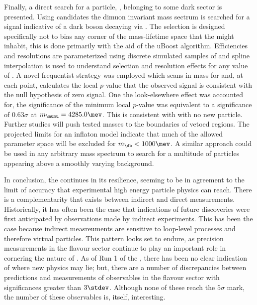 Finally, a direct search for a \np particle, \db, belonging to some dark sector is presented.
Using
\btokstrmumu candidates the dimuon invariant mass sectrum is searched for a signal indicative of a
dark boson decaying via \dbtomumu.
The selection is designed specifically not to bias any corner of the mass-lifetime space that the
\db might inhabit, this is done primarily with the aid of the uBoost algorithm.
Efficiencies and resolutions are parameterized using discrete simulated samples of \btokstrdb
and spline interpolation is used to understand selection and resolution effects for any value of
\mass{\db}.
A novel frequentist strategy was employed which scans in mass for and, at each point, calculates
the local $p$-value that the observed signal is consistent with the null hypothesis of zero signal.
One the look-elsewhere effect was accounted for, the significance of the minimum local $p$-value
was equivalent to a significance of
$0.63\sigma$ at $m_{\mumu}=4285.0\mev$.
This is consistent with with no new particle.
Further studies will push tested masses to the boundaries of vetoed regions.
The projected limits for an inflaton model indicate that much of the allowed parameter space will
be excluded for $m_\db<1000\mev$.
A similar approach could be used in any arbitrary mass spectrum to search for a multitude of
particles appearing above a smoothly varying background.


In conclusion, the \sm continues in its resilience, seeming to be in agreement to the limit of
accuracy that experimental high energy particle physics can reach.
There is a complementarity that exists between indirect and direct measurements.
Historically, it has often been the case that indications of future discoveries were first
anticipated by observations made by indirect experiments.
This has been the case because indirect measreuments are sensitive to loop-level processes and
therefore virtual particles.
This pattern looks set to endure,
as precision measurements in the flavour sector continue to play an important role in
cornering the nature of \np.
As of Run 1 of the \lhc, there has been no clear indication of where new physics may lie;
but, there are a number of discrepancies between \sm predictions and measurements of observables in
the flavour sector with significances greater than $3\stdev$.
Although none of these reach the $5\sigma$ mark, the number of these observables is, itself,
interesting.

